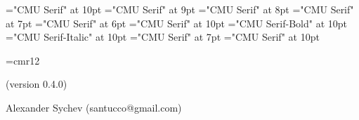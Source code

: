 \def\ver{0.4.0}
\font\tenrm="CMU Serif" at 10pt \tenrm
\font\ninerm="CMU Serif" at 9pt \ninerm
\font\eightrm="CMU Serif" at 8pt \eightrm 
\font\sevenrm="CMU Serif" at 7pt \sevenrm
\font\sixrm="CMU Serif" at 6pt \sixrm
\font\tentex="CMU Serif" at 10pt \tentex
\font\tenbf="CMU Serif-Bold" at 10pt \tenbf 
\font\tenit="CMU Serif-Italic" at 10pt \tenit 
\font\titlefont="CMU Serif" at 7pt   \titlefont 
\font\ttitlefont="CMU Serif" at 10pt  \ttitlefont

\def\As{\note{Также смотри секции}} %
\def\U{\note{Используется в секции}} %
\def\Us{\note{Используется в секциях}} %
\def\A{\note{Также смотри секцию}} %
\def\ET{ и~} %
\def\ETs{, и~} %
\def\fin{\par\vfill\eject %
  \ifpagesaved\null\vfill\eject\fi %
  \if L\lr\else\null\vfill\eject\fi %
  \parfillskip 0pt plus 1fil
  \def\grouptitle{НАЗВАНИЯ СЕКЦИЙ}
  \let\topsecno=\nullsec
  \message{Названия секций:}
  \output={\normaloutput\page\lheader\rheader}
  \setpage
  \def\note##1##2.{\quad{\eightrm##1~\ifacro{\pdfnote##2.}\else{##2}\fi.}}
  \def\Q{\note{Расположено в секции}} %
  \def\Qs{\note{Расположено в секциях}} %
  \def\U{\note{Используется в секции}} %
  \def\Us{\note{Используется в секциях}} %
  \def\I{\par\hangindent 2em}\let\*=*
  \def\outsecname{Названия секций}
  \ifacro \let\Xpdf\X
  \ifpdftex \makebookmarks \pdfdest name {NOS} fitb
    \pdfoutline goto name {NOS} count -\secno {\outsecname}
    \def\X##1:##2\X{\Xpdf##1:##2\X \firstsecno##1.%
      {\toksF={}\makeoutlinetoks##2\outlinedone\outlinedone}%
      \pdfoutline goto num \the\toksA \expandafter{\the\toksE}}
  \else\ifpdf
    \special{pdf: outline -1 << /Title (\outsecname)
      /Dest [ @thispage /FitH @ypos ] >>}
    \def\X##1:##2\X{\Xpdf##1:##2\X \firstsecno##1.%
      {\toksF={}\makeoutlinetoks##2\outlinedone\outlinedone}%
      \special{pdf: outline 0 << /Title (\the\toksE)
        /A << /S /GoTo /D (\romannumeral\the\toksA) >> >>}}
  \fi\fi\fi
  \readsections}


\font\authorfont=cmr12
 \titletrue\eject
\null\vfill
\centerline{\stitle}
\vskip 10pt\centerline{(version \ver)}
\vskip 24pt
\centerline{\authorfont Alexander Sychev (santucco@gmail.com)}
\vfill

